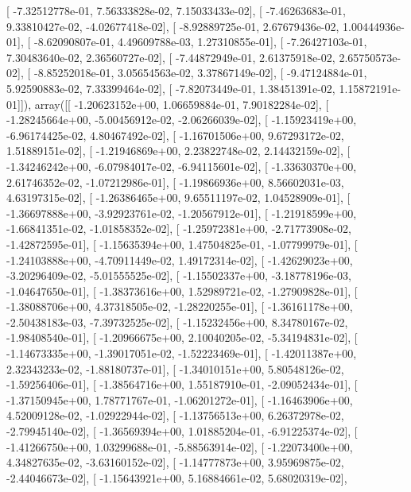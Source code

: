 \documentclass{article}
\begin{document}
       [ -7.32512778e-01,   7.56333828e-02,   7.15033433e-02],
       [ -7.46263683e-01,   9.33810427e-02,  -4.02677418e-02],
       [ -8.92889725e-01,   2.67679436e-02,   1.00444936e-01],
       [ -8.62090807e-01,   4.49609788e-03,   1.27310855e-01],
       [ -7.26427103e-01,   7.30483640e-02,   2.36560727e-02],
       [ -7.44872949e-01,   2.61375918e-02,   2.65750573e-02],
       [ -8.85252018e-01,   3.05654563e-02,   3.37867149e-02],
       [ -9.47124884e-01,   5.92590883e-02,   7.33399464e-02],
       [ -7.82073449e-01,   1.38451391e-02,   1.15872191e-01]]), array([[ -1.20623152e+00,   1.06659884e-01,   7.90182284e-02],
       [ -1.28245664e+00,  -5.00456912e-02,  -2.06266039e-02],
       [ -1.15923419e+00,  -6.96174425e-02,   4.80467492e-02],
       [ -1.16701506e+00,   9.67293172e-02,   1.51889151e-02],
       [ -1.21946869e+00,   2.23822748e-02,   2.14432159e-02],
       [ -1.34246242e+00,  -6.07984017e-02,  -6.94115601e-02],
       [ -1.33630370e+00,   2.61746352e-02,  -1.07212986e-01],
       [ -1.19866936e+00,   8.56602031e-03,   4.63197315e-02],
       [ -1.26386465e+00,   9.65511197e-02,   1.04528909e-01],
       [ -1.36697888e+00,  -3.92923761e-02,  -1.20567912e-01],
       [ -1.21918599e+00,  -1.66841351e-02,  -1.01858352e-02],
       [ -1.25972381e+00,  -2.71773908e-02,  -1.42872595e-01],
       [ -1.15635394e+00,   1.47504825e-01,  -1.07799979e-01],
       [ -1.24103888e+00,  -4.70911449e-02,   1.49172314e-02],
       [ -1.42629023e+00,  -3.20296409e-02,  -5.01555525e-02],
       [ -1.15502337e+00,  -3.18778196e-03,  -1.04647650e-01],
       [ -1.38373616e+00,   1.52989721e-02,  -1.27909828e-01],
       [ -1.38088706e+00,   4.37318505e-02,  -1.28220255e-01],
       [ -1.36161178e+00,  -2.50438183e-03,  -7.39732525e-02],
       [ -1.15232456e+00,   8.34780167e-02,  -1.98408540e-01],
       [ -1.20966675e+00,   2.10040205e-02,  -5.34194831e-02],
       [ -1.14673335e+00,  -1.39017051e-02,  -1.52223469e-01],
       [ -1.42011387e+00,   2.32343233e-02,  -1.88180737e-01],
       [ -1.34010151e+00,   5.80548126e-02,  -1.59256406e-01],
       [ -1.38564716e+00,   1.55187910e-01,  -2.09052434e-01],
       [ -1.37150945e+00,   1.78771767e-01,  -1.06201272e-01],
       [ -1.16463906e+00,   4.52009128e-02,  -1.02922944e-02],
       [ -1.13756513e+00,   6.26372978e-02,  -2.79945140e-02],
       [ -1.36569394e+00,   1.01885204e-01,  -6.91225374e-02],
       [ -1.41266750e+00,   1.03299688e-01,  -5.88563914e-02],
       [ -1.22073400e+00,   4.34827635e-02,  -3.63160152e-02],
       [ -1.14777873e+00,   3.95969875e-02,  -2.44046673e-02],
       [ -1.15643921e+00,   5.16884661e-02,   5.68020319e-02],
\end{document}
